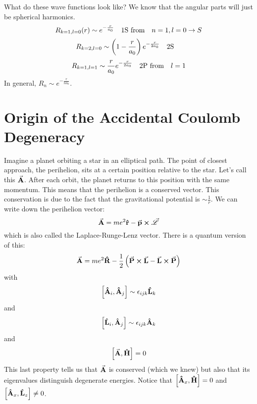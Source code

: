 \documentclass[a4paper,twoside,master.tex]{subfiles}
\begin{document}
What do these wave functions look like? We know that the angular parts will just be spherical harmonics.
\begin{equation}
    R_{k=1,l=0}(r) \sim e^{- \frac{r}{a_0}} \qq{1S from} n=1,l=0 \to S
\end{equation}
\begin{equation}
    R_{k=2,l=0} \sim \left( 1 - \frac{r}{a_0} \right) e^{- \frac{r}{2 a_0}} \qq{2S}
\end{equation}
\begin{equation}
    R_{k=1,l=1} \sim \frac{r}{a_0} e^{- \frac{r}{2 a_0}} \qq{2P from} l=1 
\end{equation}
In general, $ R_n \sim e^{- \frac{r}{na_0}} $.

\section{Origin of the Accidental Coulomb Degeneracy}
\label{sec:origin_of_the_accidental_coulomb_degeneracy}

Imagine a planet orbiting a star in an elliptical path. The point of closest approach, the perihelion, sits at a certain position relative to the star. Let's call this $ \va{A} $. After each orbit, the planet returns to this position with the same momentum. This means that the perihelion is a conserved vector. This conservation is due to the fact that the gravitational potential is $ \sim \frac{1}{r} $. We can write down the perihelion vector:
\begin{equation}
    \va{A} = m e^2 \vu{r} - \va{p} \cross \va{\mathscr{L}}
\end{equation}
which is also called the Laplace-Runge-Lenz vector. There is a quantum version of this:
\begin{equation}
    \va{A} = m e^2 \vu{R} - \frac{1}{2} \left( \va{P} \cross \va{L} - \va{L} \cross \va{P} \right)
\end{equation}
with
\begin{equation}
    \comm{\vu{A}_i}{\vu{A}_j} \sim \epsilon_{ijk} \vu{L}_k
\end{equation}
and
\begin{equation}
    \comm{ \vu{L}_i}{ \vu{A}_j} \sim \epsilon_{ijk} \vu{A}_k
\end{equation}
and
\begin{equation}
    \comm{ \va{A}}{ \vu{H}} = 0
\end{equation}
This last property tells us that $ \va{A} $ is conserved (which we knew) but also that its eigenvalues distinguish degenerate energies. Notice that $ \comm{ \vu{A}_x}{ \vu{H}} = 0 $ and $ \comm{ \vu{A}_x}{ \vu{L}_z} \neq 0 $.
\end{document}
